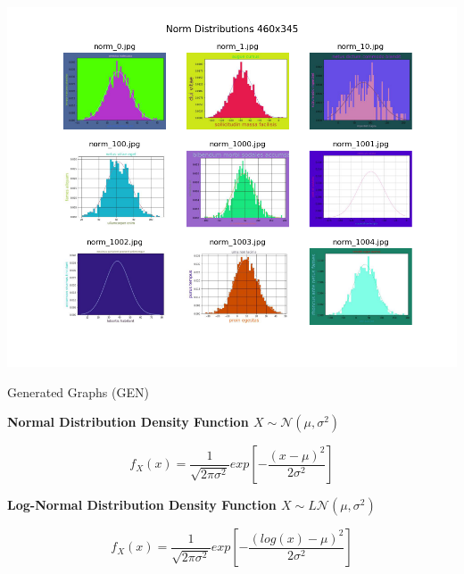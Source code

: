 \documentclass[12pt]{article}
\begin{document}
            \begin{table}[ht]
            
                \begin{center}

                    \includegraphics[scale=0.6]{norm_460x345_overview.png}
                    \caption{Generated Graphs (GEN)}
                    \label{generated-overview}
        
                \end{center}
                
            \end{table}

            \textbf{Normal Distribution Density Function  $ X \sim \mathcal{N}(\mu, \sigma^2)  $}
               
            \begin{Large} 

                \[ f_X(x) = \frac{1}{\sqrt{2\pi \sigma^2}} exp\left[{-\frac{(x - \mu)^2}{2 \sigma^2}}\right] \] 

            \end{Large}

            \textbf{Log-Normal Distribution Density Function  $ X \sim L\mathcal{N}(\mu, \sigma^2) $}

            \begin{Large} 

                \[ f_X(x) = \frac{1}{\sqrt{2\pi \sigma^2}} exp\left[{-\frac{(log(x) - \mu)^2}{2 \sigma^2}}\right] \] 

            \end{Large}
\end{document}
